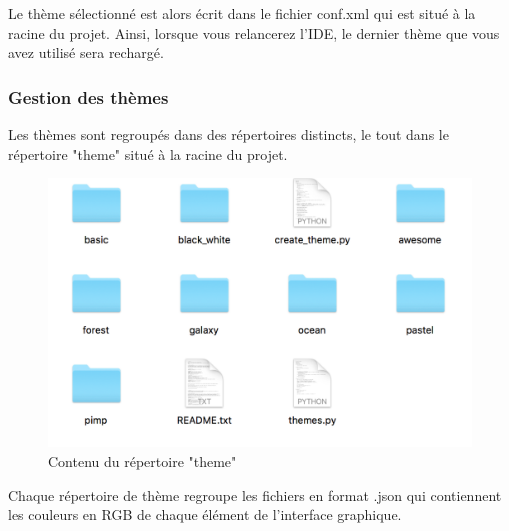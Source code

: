 \documentclass[a4paper,12pt]{article}
\begin{document}
			Le thème sélectionné est alors écrit dans le fichier conf.xml qui est situé à la racine du projet. Ainsi, lorsque vous relancerez l'IDE, le dernier thème que vous avez utilisé sera rechargé.
			
			\subsubsection{Gestion des thèmes}
		
			Les thèmes sont regroupés dans des répertoires distincts, le tout dans le répertoire "theme" situé à la racine du projet. 
			\begin{figure}[h!]
				\begin{center}
					\includegraphics[scale=0.7]{images/imgs_themes/themes}
					\caption{Contenu du répertoire "theme"}
				\end{center}
			\end{figure}
			
			Chaque répertoire de thème regroupe les fichiers en format .json qui contiennent les couleurs en RGB de chaque élément de l'interface graphique.
			
\end{document}
